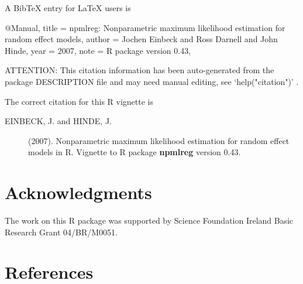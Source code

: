 \documentclass[a4paper]{article}
\begin{document}
\begin{landscape}
\begin{Schunk}
\begin{Soutput}
A BibTeX entry for LaTeX users is

  @Manual{,
    title = {npmlreg: Nonparametric maximum likelihood estimation for random effect
models},
    author = {Jochen Einbeck and Ross Darnell and John Hinde},
    year = {2007},
    note = {R package version 0.43},
  }

ATTENTION: This citation information has been auto-generated from the
package DESCRIPTION file and may need manual editing, see
‘help("citation")’ .
\end{Soutput}
\end{Schunk}
\medskip

\noindent The correct citation for this R vignette is 
\medskip
 
\noindent
\begin{description}
\item[EINBECK, J. and HINDE, J.] (2007). Nonparametric maximum
     likelihood estimation for random effect models in R. Vignette to R
     package  {\bf npmlreg} version 0.43.
\end{description} 
 
\section*{Acknowledgments}
 
The work on this R package was supported by Science
Foundation Ireland Basic Research Grant 04/BR/M0051.
  
\section{References}
 

\end{landscape}
\end{document}
